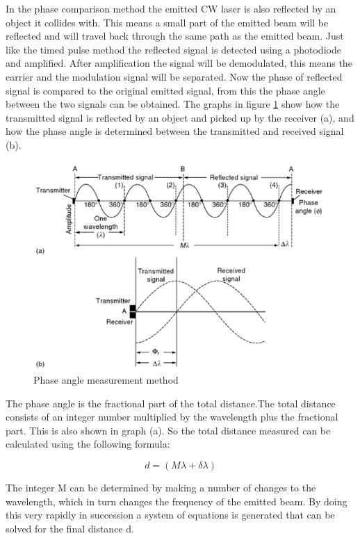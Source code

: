 \documentclass{article}
\begin{document}
In the phase comparison method the emitted CW laser is also reflected by an object it collides with. This means a small part of the emitted beam will be reflected and will travel back through the same path as the emitted beam. Just like the timed pulse method the reflected signal is detected using a photodiode and amplified. After amplification the signal will be demodulated, this means the carrier and the modulation signal will be separated. Now the phase of reflected signal is compared to the original emitted signal, from this the phase angle between the two signals can be obtained. The graphs in figure \ref{lidar3} show how the transmitted signal is reflected by an object and picked up by the receiver (a), and how the phase angle is determined between the transmitted and received signal (b). 



\begin{figure}[H]
	\centering
	\includegraphics[scale=0.8]{figures/Phaseangle}
	\caption{Phase angle measurement method }
	\label{lidar3}
\end{figure}

The phase angle is the fractional part of the total distance.The total distance consists of an integer number multiplied by the wavelength plus the fractional part. This is also shown in graph (a). So the total distance measured can be calculated using the following formula:

\begin{equation}
d = (M \lambda + \delta \lambda)
\end{equation}

The integer M can be determined by making a number of changes to the wavelength, which in turn changes the frequency of the emitted beam. By doing this very rapidly in succession a system of equations is generated that can be solved for the final distance d.
\end{document}
